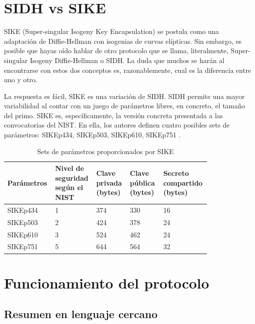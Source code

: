 %
%

\section{SIDH vs SIKE}

SIKE (Super-singular Isogeny Key Encapsulation) \cite{sike-org}  \cite{SIKE} se postula como una adaptación de Diffie-Hellman con isogenias de curvas elípticas. Sin embargo, es posible que hayas oído hablar de otro protocolo que se llama, literalmente, Super-singular Isogeny Diffie-Hellman o SIDH. La duda que muchos se harán al encontrarse con estos dos conceptos es, razonablemente, cual es la diferencia entre uno y otro.

La respuesta es fácil, SIKE es una variación de SIDH. SIDH permite una mayor variabilidad al contar con un juego de parámetros libres, en concreto, el tamaño del primo. SIKE es, específicamente, la versión concreta presentada a las convocatorias del NIST. En ella, los autores definen cuatro posibles sets de parámetros: SIKEp434, SIKEp503, SIKEp610, SIKEp751 \cite{SIKE_specifications}.

\begin{table}[h]
    \centering
    \begin{tabular}{|p{0.17\linewidth}||p{0.17\linewidth}|p{0.16\linewidth}|p{0.16\linewidth}|p{0.16\linewidth}|}
         \hline
        Parámetros & Nivel de seguridad según el NIST & Clave privada (bytes) & Clave pública (bytes) & Secreto compartido (bytes)\\ \hline
        SIKEp434 & 1 & 374 & 330 & 16\\ \hline
        SIKEp503 & 2 & 424 & 378 & 24\\ \hline
        SIKEp610 & 3 & 524 & 462 & 24\\ \hline
        SIKEp751 & 5 & 644 & 564 & 32\\ \hline
    \end{tabular}
    \caption{Sets de parámetros proporcionados por SIKE}
    \label{tab:sike_parameters}
\end{table}

%
%

\section{Funcionamiento del protocolo}

 \subsection{Resumen en lenguaje cercano}


